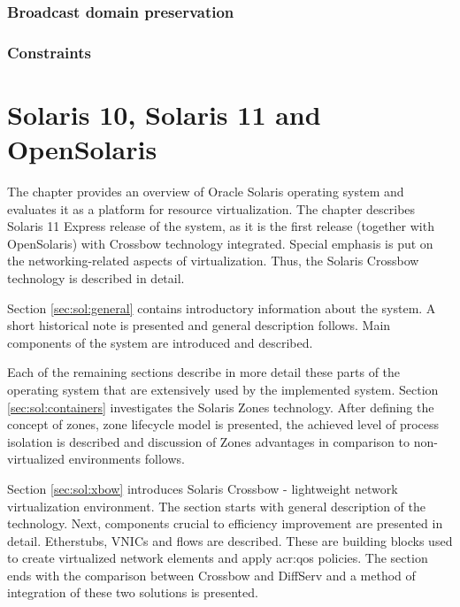 \documentclass[11pt]{book}
\begin{document}

      \subsection{Broadcast domain preservation}

	  
		

      \subsection{Constraints}


  \chapter{Solaris 10, Solaris 11 and OpenSolaris}
  

    The chapter provides an overview of Oracle Solaris operating system and evaluates it as a platform for resource
    virtualization. The chapter describes Solaris 11 Express release of the system, as it is the first release
    (together with OpenSolaris) with Crossbow technology integrated. Special emphasis is put on the networking-related
    aspects of virtualization. Thus, the Solaris Crossbow technology is described in detail.

    Section \ref{sec:sol:general} contains introductory information about the system. A short historical note is
    presented and general description follows. Main components of the system are introduced and described.
    
    Each of the remaining sections describe in more detail these parts of the operating system that are extensively
    used by the implemented system. Section \ref{sec:sol:containers} investigates the Solaris Zones technology. After
    defining the concept of zones, zone lifecycle model is presented, the achieved level of process isolation is
    described and discussion of Zones advantages in comparison to non-virtualized environments follows.

    Section \ref{sec:sol:xbow} introduces Solaris Crossbow - lightweight network virtualization environment. The
    section starts with general description of the technology. Next, components crucial to efficiency improvement are
    presented in detail. Etherstubs, VNICs and flows are described. These are building blocks used to create
    virtualized network elements and apply \gls{acr:qos} policies. The section ends with the comparison between Crossbow and
    DiffServ and a method of integration of these two solutions is presented.
\end{document}
